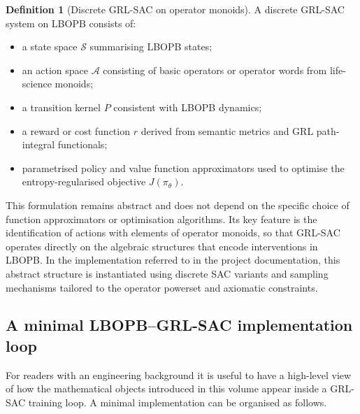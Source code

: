 \documentclass[11pt]{book}
\theoremstyle{plain}
\theoremstyle{definition}
\newtheorem{definition}[theorem]{Definition}
\theoremstyle{remark}
\begin{document}
\begin{definition}[Discrete GRL-SAC on operator monoids]
A discrete GRL-SAC system on LBOPB consists of:
\begin{itemize}
  \item a state space $\mathcal{S}$ summarising LBOPB states;
  \item an action space $\mathcal{A}$ consisting of basic operators or
        operator words from life-science monoids;
  \item a transition kernel $P$ consistent with LBOPB dynamics;
  \item a reward or cost function $r$ derived from semantic metrics
        and GRL path-integral functionals;
  \item parametrised policy and value function approximators used to
        optimise the \\entropy-regularised objective $J(\pi_{\theta})$.
\end{itemize}
\end{definition}

This formulation remains abstract and does not depend on the specific
choice of function approximators or optimisation algorithms. Its key
feature is the identification of actions with elements of operator
monoids, so that GRL-SAC operates directly on the algebraic structures
that encode interventions in LBOPB. In the implementation referred to
in the project documentation, this abstract structure is instantiated
using discrete SAC variants and sampling mechanisms tailored to the
operator powerset and axiomatic constraints.

\subsection{A minimal LBOPB--GRL-SAC implementation loop}

For readers with an engineering background it is useful to have a
high-level view of how the mathematical objects introduced in this
volume appear inside a GRL-SAC training loop. A minimal implementation
can be organised as follows.
\end{document}

